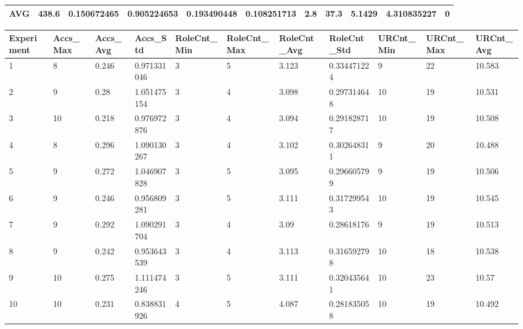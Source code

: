 \begin{table}[H]
\begin{adjustbox}{max width=380pt,keepaspectratio,angle=90}
\begin{tabular}{|l|l|l|l|l|l|l|l|l|l|l|}
						AVG        & 438.6 & 0.150672465  & 0.905224653  & 0.193490448  & 0.108251713  & 2.8       & 37.3      & 5.1429    & 4.310835227 & 0         \\ \hline
					\end{tabular}
				\end{adjustbox}
				\begin{adjustbox}{max width=380pt,keepaspectratio,angle=90}
					\begin{tabular}{|l|l|l|l|l|l|l|l|l|l|l|}
						\rowcolor[HTML]{EFEFEF} 
						\hline
						Experiment & Accs\_Max & Accs\_Avg & Accs\_Std   & RoleCnt\_Min & RoleCnt\_Max & RoleCnt\_Avg & RoleCnt\_Std & URCnt\_Min & URCnt\_Max & URCnt\_Avg \\ \hline
						1          & 8         & 0.246     & 0.971331046 & 3            & 5            & 3.123        & 0.334471224  & 9          & 22         & 10.583     \\ \hline
						2          & 9         & 0.28      & 1.051475154 & 3            & 4            & 3.098        & 0.297314648  & 10         & 19         & 10.531     \\ \hline
						3          & 10        & 0.218     & 0.976972876 & 3            & 4            & 3.094        & 0.291828717  & 10         & 19         & 10.508     \\ \hline
						4          & 8         & 0.296     & 1.090130267 & 3            & 4            & 3.102        & 0.302648311  & 9          & 20         & 10.488     \\ \hline
						5          & 9         & 0.272     & 1.046907828 & 3            & 5            & 3.095        & 0.296605799  & 9          & 19         & 10.506     \\ \hline
						6          & 9         & 0.246     & 0.956809281 & 3            & 5            & 3.111        & 0.317299543  & 10         & 19         & 10.545     \\ \hline
						7          & 9         & 0.292     & 1.090291704 & 3            & 4            & 3.09         & 0.28618176   & 9          & 19         & 10.513     \\ \hline
						8          & 9         & 0.242     & 0.953643539 & 3            & 4            & 3.113        & 0.316592798  & 10         & 18         & 10.538     \\ \hline
						9          & 10        & 0.275     & 1.111474246 & 3            & 5            & 3.111        & 0.320435641  & 10         & 23         & 10.57      \\ \hline
						10         & 10        & 0.231     & 0.838831926 & 4            & 5            & 4.087        & 0.281835058  & 10         & 19         & 10.492     \\ \hline\hline

\end{tabular}
\end{adjustbox}
\end{table}
